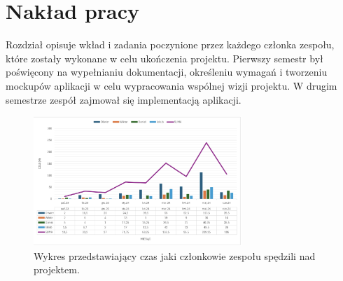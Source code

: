 \chapter{Nakład pracy}

Rozdział opisuje wkład i zadania poczynione przez każdego członka zespołu, które zostały wykonane w celu ukończenia projektu. Pierwszy semestr był poświęcony na wypełnianiu dokumentacji, określeniu wymagań i tworzeniu mockupów aplikacji w celu wypracowania wspólnej wizji projektu. W drugim semestrze zespół zajmował się implementacją aplikacji.

\begin{figure}[H]
    \centering
    \includegraphics[width=0.7\textwidth]{chapters/chapter_11/wykres}
    \caption{Wykres przedstawiający czas jaki członkowie zespołu spędzili nad projektem.}
    \label{img:wykres}
\end{figure}